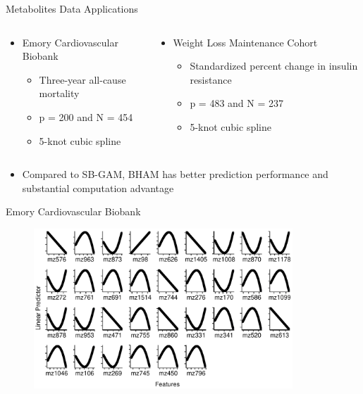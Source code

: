 \documentclass[
  ignorenonframetext,
  aspectratio=169]{beamer}
\providecommand{\tightlist}{%
  \setlength{\itemsep}{0pt}\setlength{\parskip}{0pt}}
\begin{document}
\begin{frame}{Metabolites Data Applications}
\protect\hypertarget{metabolites-data-applications}{}
\begin{columns}[T]
\begin{column}{0.48\textwidth}
\begin{itemize}
\tightlist
\item
  Emory Cardiovascular Biobank

  \begin{itemize}
  \tightlist
  \item
    Three-year all-cause mortality
  \item
    p = 200 and N = 454
  \item
    5-knot cubic spline
  \end{itemize}
\end{itemize}
\end{column}

\begin{column}{0.48\textwidth}
\begin{itemize}
\tightlist
\item
  Weight Loss Maintenance Cohort

  \begin{itemize}
  \tightlist
  \item
    Standardized percent change in insulin resistance
  \item
    p = 483 and N = 237
  \item
    5-knot cubic spline
  \end{itemize}
\end{itemize}
\end{column}
\end{columns}

\begin{itemize}
\tightlist
\item
  Compared to SB-GAM, BHAM has better prediction performance and
  substantial computation advantage
\end{itemize}
\end{frame}

\begin{frame}{Emory Cardiovascular Biobank}
\protect\hypertarget{emory-cardiovascular-biobank}{}
\begin{figure}
\centering
\includegraphics[height=6cm]{ECB_plot_wide.pdf}
\end{figure}
\end{frame}
\end{document}
